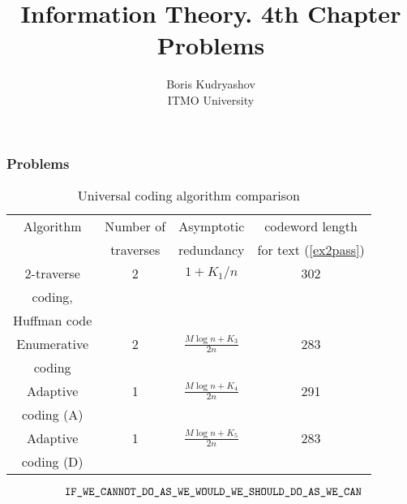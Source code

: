\documentclass[14pt]{beamer}
\title{\small{Information Theory. 4th Chapter Problems}}
\author{\huge{
Boris Kudryashov \\
\vspace{30pt}
ITMO University
}}
\begin{document}
\maketitle

  
\begin{frame}
\frametitle{Problems}
\begin{enumerate}
\footnotesize {
    \begin{table}[htbp]
        \caption{Universal coding algorithm comparison}
        \begin{center}
        \begin{tabular}
        {|c|c|c|c|}  \hline %
        Algorithm & Number of  & Asymptotic &   codeword length  \\ %
                  & traverses  & redundancy &   for text (\ref{ex2pass})    \\%
        \hline %
        2-traverse  & 2& $1 + K_1 / n$& 302 \\%
        coding, &  &  &  \\ %
        Huffman code &  &  &  \\ \hline%
        Enumerative & 2& $\frac{M\log n + K_3 }{2n}$& 283 \\ %
        coding      &  &  &  \\\hline %
         Adaptive & 1& $\frac{M\log n + K_4 }{2n}$& 291 \\%
         coding (A) &  &  &   \\\hline %
        Adaptive  & 1& $\frac{M\log n + K_5 }{2n}$&283 \\%
        coding (D) &  &  &  \\\hline
        \end{tabular}
        \label{tab3_6} \end{center}
    \end{table}
      
    \begin{equation}
    \label{ex2pass} {\texttt{
    IF{\_}WE{\_}CANNOT{\_}DO{\_}AS{\_}WE{\_}WOULD{\_}WE{\_}SHOULD{\_}DO{\_}AS{\_}WE{\_}CAN} }\\
    \end{equation}  
}
\end{enumerate}
\end{frame}  
  
\end{document}
